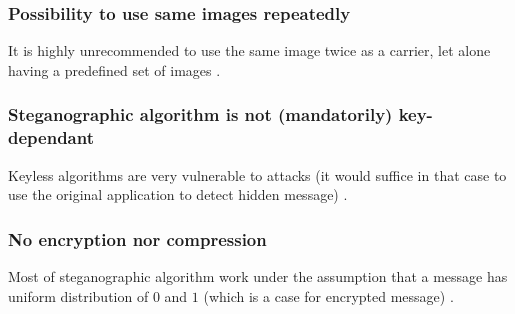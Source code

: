 \subsubsection{Possibility to use same images repeatedly}
It is highly unrecommended to use the same image twice as a carrier, let alone having 
a predefined set of images
\cite{app0, app1, app2, app3, app7, app8,app9,app10,app11,app12,app13,app14,app15,app16,app17,app18, app19}
.

\subsubsection{Steganographic algorithm is not (mandatorily) key-dependant}
Keyless algorithms are very vulnerable to attacks (it would suffice in that case
to use the original application to detect hidden message)
\cite{app2, app3, app4, app7, app9, app11, app14, app16, app17, app19}
.

\subsubsection{No encryption nor compression}
Most of steganographic algorithm work under the assumption that a message has uniform distribution
of $0$ and $1$ (which is a case for encrypted message)
\cite{app0, app3, app4, app7, app11}
.
